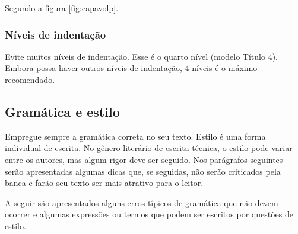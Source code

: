 Segundo a figura \ref{fig:capavolp}.
\subsubsection{Níveis de indentação}
Evite muitos níveis de indentação. Esse é o quarto nível (modelo Título 4). Embora possa haver outros níveis de indentação, 4 níveis é o máximo recomendado.
\subsection{Gramática e estilo}
Empregue sempre a gramática correta no seu texto. Estilo é uma forma individual de escrita. No gênero literário de escrita técnica, o estilo pode variar entre os autores, mas algum rigor deve ser seguido. Nos parágrafos seguintes serão apresentadas algumas dicas que, se seguidas, não serão criticados pela banca e farão seu texto ser mais atrativo para o leitor.

A seguir são apresentados alguns erros típicos de gramática que não devem ocorrer e algumas expressões ou termos que podem ser escritos por questões de estilo.

